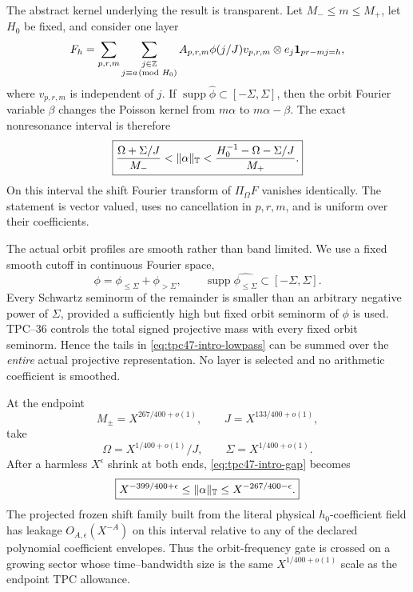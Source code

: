 The abstract kernel underlying the result is transparent.  Let
\(M_-\le m\le M_+\), let \(H_0\) be fixed, and consider one layer
\begin{equation}
 F_h=\sum_{p,r,m}\sum_{\substack{j\in\mathbb Z\\j\equiv a\!\!\pmod{H_0}}}
 A_{p,r,m}\phi(j/J)v_{p,r,m}\otimes e_j
 \mathbf 1_{pr-mj=h},
 \label{eq:tpc47-intro-layer}
\end{equation}
where \(v_{p,r,m}\) is independent of \(j\).  If
\(\operatorname{supp}\widehat\phi\subset[-\Sigma,\Sigma]\), then
the orbit Fourier variable \(\beta\) changes the Poisson kernel from
\(m\alpha\) to \(m\alpha-\beta\).  The exact nonresonance interval is
therefore
\begin{equation}
 \boxed{
 \frac{\Omega+\Sigma/J}{M_-}
 <\|\alpha\|_{\mathbb T}<
 \frac{H_0^{-1}-\Omega-\Sigma/J}{M_+}.}
 \label{eq:tpc47-intro-gap}
\end{equation}
On this interval the shift Fourier transform of
\(\Pi_\Omega F\) vanishes identically.  The statement is vector valued,
uses no cancellation in \(p,r,m\), and is uniform over their
coefficients.

The actual orbit profiles are smooth rather than band limited.  We use
a fixed smooth cutoff in continuous Fourier space,
\begin{equation}
 \phi=\phi_{\le\Sigma}+\phi_{>\Sigma},
 \qquad
 \operatorname{supp}\widehat{\phi_{\le\Sigma}}
 \subset[-\Sigma,\Sigma].
 \label{eq:tpc47-intro-lowpass}
\end{equation}
Every Schwartz seminorm of the remainder is smaller than an arbitrary
negative power of \(\Sigma\), provided a sufficiently high but fixed
orbit seminorm of \(\phi\) is used.  TPC--36 controls the total signed
projective mass with every fixed orbit seminorm.  Hence the tails in
\eqref{eq:tpc47-intro-lowpass} can be summed over the \emph{entire}
actual projective representation.  No layer is selected and no
arithmetic coefficient is smoothed.

At the endpoint
\begin{equation}
 M_\pm=X^{267/400+o(1)},\qquad
 J=X^{133/400+o(1)},
 \label{eq:tpc47-intro-endpoint-scales}
\end{equation}
take
\begin{equation}
 \Omega=X^{1/400+o(1)}/J,
 \qquad \Sigma=X^{1/400+o(1)}.
 \label{eq:tpc47-intro-endpoint-bands}
\end{equation}
After a harmless \(X^\epsilon\) shrink at both ends,
\eqref{eq:tpc47-intro-gap} becomes
\begin{equation}
 \boxed{
 X^{-399/400+\epsilon}
 \le\|\alpha\|_{\mathbb T}\le
 X^{-267/400-\epsilon}.}
 \label{eq:tpc47-intro-endpoint-gap}
\end{equation}
The projected frozen shift family built from the literal physical
\(h_0\)-coefficient field has leakage \(O_{A,\epsilon}(X^{-A})\) on this
interval relative to any of the declared polynomial coefficient
envelopes.  Thus the orbit-frequency
gate is crossed on a growing sector whose time--bandwidth size is the
same \(X^{1/400+o(1)}\) scale as the endpoint TPC allowance.

